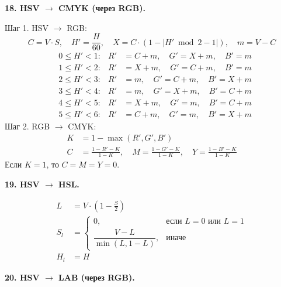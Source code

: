 \documentclass[12pt,a4paper]{article}
\begin{document}
\textbf{18. HSV \(\to\) CMYK (через RGB).}

Шаг 1. HSV \(\to\) RGB:
\[
C = V \cdot S,\quad H' = \frac{H}{60},\quad X = C \cdot (1 - |H' \bmod 2 - 1|),\quad m = V - C
\]
\begin{align*}
&0 \le H' < 1: & R' &= C + m,\quad G' = X + m,\quad B' = m \\
&1 \le H' < 2: & R' &= X + m,\quad G' = C + m,\quad B' = m \\
&2 \le H' < 3: & R' &= m,\quad G' = C + m,\quad B' = X + m \\
&3 \le H' < 4: & R' &= m,\quad G' = X + m,\quad B' = C + m \\
&4 \le H' < 5: & R' &= X + m,\quad G' = m,\quad B' = C + m \\
&5 \le H' < 6: & R' &= C + m,\quad G' = m,\quad B' = X + m
\end{align*}
Шаг 2. RGB \(\to\) CMYK:
\begin{align*}
K &= 1 - \max(R', G', B') \\
C &= \frac{1 - R' - K}{1 - K},\quad M = \frac{1 - G' - K}{1 - K},\quad Y = \frac{1 - B' - K}{1 - K}
\end{align*}
Если \(K = 1\), то \(C = M = Y = 0\).

\textbf{19. HSV \(\to\) HSL.}

\begin{align*}
L &= V \cdot \left( 1 - \frac{S}{2} \right) \\
S_l &= \begin{cases} 0, & \text{если } L = 0 \text{ или } L = 1 \\[8pt] \dfrac{V - L}{\min(L, 1 - L)}, & \text{иначе} \end{cases} \\
H_l &= H
\end{align*}

\textbf{20. HSV \(\to\) LAB (через RGB).}
\end{document}
